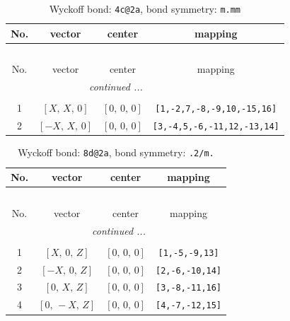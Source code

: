 \documentclass[fleqn,8pt]{jsarticle}
\begin{document}
\renewcommand{\arraystretch}{1.2}
\begin{longtable}{cccc}
\caption{Wyckoff bond: {\tt 4c@2a}, bond symmetry: {\tt m.mm}}
 \\
 \hline \hline
No. & vector & center & mapping \\ \hline \endfirsthead

\multicolumn{3}{l}{\tablename\ \thetable{}} \\
 \hline \hline
No. & vector & center & mapping \\ \hline \endhead

 \hline \hline
\multicolumn{3}{r}{\footnotesize\it continued ...} \\ \endfoot

 \hline \hline
\multicolumn{3}{r}{} \\ \endlastfoot

1 & $\left[ X,\, X,\, 0 \right]$ & $\left[ 0,\, 0,\, 0 \right]$ & {\tt [1,-2,7,-8,-9,10,-15,16]} \\ \hline
2 & $\left[ - X,\, X,\, 0 \right]$ & $\left[ 0,\, 0,\, 0 \right]$ & {\tt [3,-4,5,-6,-11,12,-13,14]} \\
\end{longtable}
\renewcommand{\arraystretch}{1.2}
\begin{longtable}{cccc}
\caption{Wyckoff bond: {\tt 8d@2a}, bond symmetry: {\tt .2/m.}}
 \\
 \hline \hline
No. & vector & center & mapping \\ \hline \endfirsthead

\multicolumn{3}{l}{\tablename\ \thetable{}} \\
 \hline \hline
No. & vector & center & mapping \\ \hline \endhead

 \hline \hline
\multicolumn{3}{r}{\footnotesize\it continued ...} \\ \endfoot

 \hline \hline
\multicolumn{3}{r}{} \\ \endlastfoot

1 & $\left[ X,\, 0,\, Z \right]$ & $\left[ 0,\, 0,\, 0 \right]$ & {\tt [1,-5,-9,13]} \\ \hline
2 & $\left[ - X,\, 0,\, Z \right]$ & $\left[ 0,\, 0,\, 0 \right]$ & {\tt [2,-6,-10,14]} \\ \hline
3 & $\left[ 0,\, X,\, Z \right]$ & $\left[ 0,\, 0,\, 0 \right]$ & {\tt [3,-8,-11,16]} \\ \hline
4 & $\left[ 0,\, - X,\, Z \right]$ & $\left[ 0,\, 0,\, 0 \right]$ & {\tt [4,-7,-12,15]} \\
\end{longtable}
\end{document}
